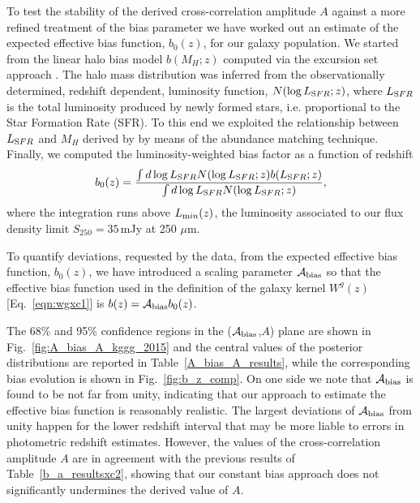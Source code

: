 To test the stability of the derived cross-correlation amplitude $A$ against a more refined treatment of the bias parameter we have worked out an estimate of the expected effective bias function, $b_0(z)$, for our galaxy population. We started from the linear halo bias model $b(M_H; z)$ computed via the excursion set approach \citep{Lapi2014}. The halo mass distribution was inferred from the observationally determined, redshift dependent, luminosity function, $N(\log{L_{\rm SFR};z})$, where $L_{\rm SFR}$ is the total luminosity produced by newly formed stars, i.e. proportional to the Star Formation Rate (SFR). To this end we exploited the relationship between $L_{\rm SFR}$ and $M_H$ derived by \citet{Aversa2015} by means of the abundance matching technique. Finally, we computed the luminosity-weighted bias factor as a function of redshift
%
\begin{equation}
b_0(z) = \frac{\int d\log{L_{\rm SFR}}N(\log{L_{\rm SFR};z}) b(L_{\rm SFR}; z)}{\int d\log{L_{\rm SFR}}N(\log{L_{\rm SFR};z})},
\end{equation}
%
where the integration runs above $L_{\rm min}(z)$, the luminosity associated to our flux density limit $S_{250}=35\,$mJy at 250 $\mu$m.

To quantify deviations, requested by the data,  from the expected effective bias function, $b_0(z)$, we have introduced a scaling parameter $\mathcal{A}_{\rm{bias}}$ so that the effective bias function used in the definition of the galaxy kernel $W^{g}(z)$ [Eq.~\eqref{eqn:wgxc1}] is $b(z) = \mathcal{A}_{\rm{bias}}b_0(z)$.

The 68\% and 95\% confidence regions in the ($\mathcal{A}_{\rm{bias}}$,$A$) plane are shown in Fig.~\eqref{fig:A_bias_A_kggg_2015} and the central values of the posterior distributions are reported in Table~\eqref{A_bias_A_results}, while the corresponding bias evolution is shown in Fig.~\eqref{fig:b_z_comp}. On one side we note that $\mathcal{A}_{\rm{bias}}$ is found to be not far from unity, indicating that our approach to estimate the effective bias function is reasonably realistic. The largest deviations of $\mathcal{A}_{\rm{bias}}$ from unity happen for the lower redshift interval that may be more liable to errors in photometric redshift estimates. However, the values of the cross-correlation amplitude $A$ are in agreement with the previous results of Table~\eqref{b_a_resultsxc2}, showing that our constant bias approach does not significantly undermines the derived value of $A$.

